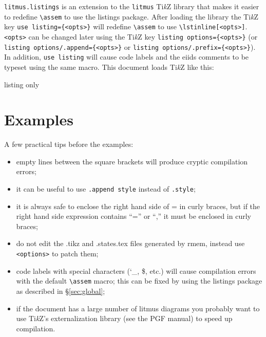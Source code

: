 \documentclass[a4paper]{article}
\newcommand{\TikZ}{Ti\textit{k}Z}
\begin{document}
\verb|litmus.listings| is an extension to the \verb|litmus| \TikZ{} library
that makes it easier to redefine \lstinline+\assem+ to use the listings package.
After loading the library the \TikZ{} key \lstinline+use listing={<opts>}+
will redefine \lstinline+\assem+ to use \lstinline+\lstinline[<opts>]+.
\lstinline+<opts>+ can be changed later using the \TikZ{} key \lstinline+listing options={<opts>}+ (or \lstinline+listing options/.append={<opts>}+ or \lstinline+listing options/.prefix={<opts>}+).
In addition, \lstinline+use listing+ will cause code labels
and the eiids comments to be typeset using the same macro. This document
loads \TikZ{} like this:
\begin{tcblisting}{listing only}
\usepackage{tikz}
\usetikzlibrary{litmus, litmus.listings}
\end{tcblisting}


\section{Examples}\label{sec:examples}

A few practical tips before the examples:
\begin{itemize}\itemsep0ex
  \item empty lines between the square brackets will produce cryptic compilation errors;
  \item it can be useful to use \lstinline|.append style| instead of \lstinline|.style|;
  \item it is always safe to enclose the right hand side of = in curly braces,
  but if the right hand side expression contains ``='' or ``,'' it must be enclosed in curly braces;
  \item do not edit the .tikz and .states.tex files generated by rmem, instead
  use \lstinline|<options>| to patch them;
  \item code labels with special characters (\char`_, \$, etc.) will cause compilation
  errors with the default \lstinline|\assem| macro; this can be fixed by using the
  listings package as described in \S\ref{sec:global};
  \item if the document has a large number of litmus diagrams you probably
  want to use \TikZ{}'s externalization library (see the PGF manual) to
  speed up compilation.
\end{itemize}
\end{document}
